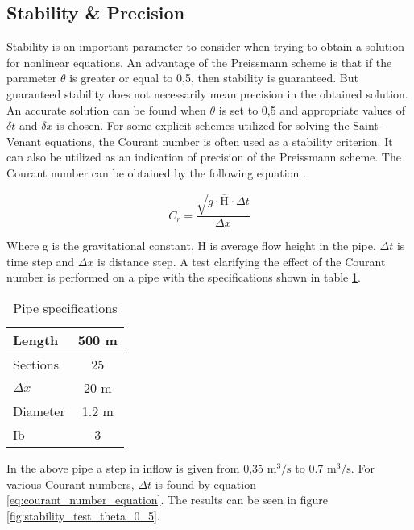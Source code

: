 \subsection{Stability \& Precision} \label{subse:stability_and_precision}

Stability is an important parameter to consider when trying to obtain a solution for nonlinear equations. 
An advantage of the Preissmann scheme is that if the parameter $\theta$ is greater or equal to 0,5, then stability is guaranteed. But guaranteed stability does not necessarily mean precision in the obtained solution. An accurate solution can be found when $\theta$ is set to 0,5 and appropriate values of $\delta t$ and $\delta x$ is chosen. For some explicit schemes utilized for solving the Saint-Venant equations, the Courant number is often used as a stability criterion. It can also be utilized as an indication of precision of the Preissmann scheme. The Courant number can be obtained by the following equation \cite{cunge1980practical, szymkiewicz2010numerical}.

\begin{equation} \label{eq:courant_number_equation}
	C_r =  \frac{\sqrt{g \cdot \overline{\text{H}}} \cdot \Delta t}{\Delta x}
\end{equation}

Where g is the gravitational constant, $\overline{\text{H}}$ is average flow height in the pipe, $\Delta t$ is time step and $\Delta x$ is distance step. A test clarifying the effect of the Courant number is performed on a pipe with the specifications shown in table \ref{tab:pipe_stability_test}.

\begin{table}[H]
\centering
\begin{tabular}{|l|c|}  \hline
Length  	& 500 m \\ \hline
Sections 	& 25  	\\ \hline
$\Delta x$	& 20 m  \\ \hline
Diameter	& 1.2 m \\ \hline
Ib			& 3 \textperthousand \\ \hline
\end{tabular}
\caption{Pipe specifications}
\label{tab:pipe_stability_test}
\end{table}

In the above pipe a step in inflow is given from 0,35 $\text{m}^\text{3}/ \text{s}$ to 0.7 $\text{m}^\text{3}/ \text{s}$. For various Courant numbers, $\Delta t$ is found by equation \ref{eq:courant_number_equation}. The results can be seen in figure \ref{fig:stability_test_theta_0_5}. 

